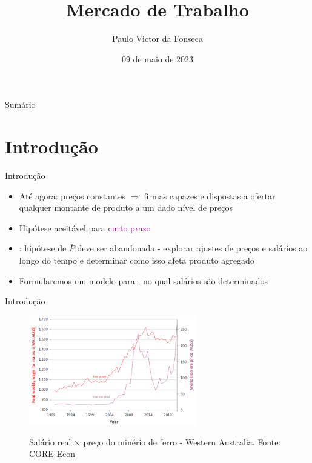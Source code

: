 \documentclass[10pt]{beamer}
\title[]{Mercado de Trabalho}
\author[]{Paulo Victor da Fonseca}
\date{09 de maio de 2023}
\begin{document}
\begin{frame}[plain]
\end{frame}

\begin{frame}{Sumário}
    \tableofcontents
\end{frame}

\section{Introdução}
\begin{frame}
    {Introdução}
    \begin{itemize}
        \item Até agora: preços constantes $\Rightarrow$ firmas capazes e dispostas a ofertar qualquer montante de produto a um dado nível de preços\bigskip
        \item Hipótese aceitável para \textcolor{purple}{curto prazo}\bigskip
        \item {}: hipótese de $\bar{P}$ deve ser abandonada - explorar ajustes de preços e salários ao longo do tempo e determinar como isso afeta produto agregado\bigskip
        \item Formularemos um modelo para , no qual salários são determinados
    \end{itemize}
\end{frame}

\begin{frame}
    {Introdução}
    \begin{figure}
        \centering
        \href{https://www.core-econ.org/the-economy/book/text/09.html}{\includegraphics[width=0.65\textwidth]{./figures/aula10_fig1.PNG}}
        \caption{Salário real $\times$ preço do minério de ferro - Western Australia. Fonte: \href{https://www.core-econ.org/the-economy/book/text/09.html}{CORE-Econ}}
    \end{figure}
\end{frame}
\end{document}

